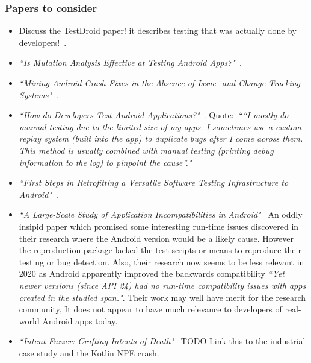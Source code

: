 \subsubsection{Papers to consider}
\begin{itemize}
    \item Discuss the TestDroid paper! it describes testing that was actually done by developers!~\cite{kaasila2012_testdroid_etc}.
    
    \item \emph{``Is Mutation Analysis Effective at Testing Android Apps?"}~\cite{deng2017_is_mutation_analysis_effective_at_testing_android_apps}.
    
    \item \emph{``Mining Android Crash Fixes in the Absence of Issue- and Change-Tracking Systems"}~\cite{kong2019_mining_android_crash_fixes}.
    
    \item \emph{``How do Developers Test Android Applications?"}~\cite{linares2017_how_do_developers_test_android_apps}. Quote:~\emph{``“I mostly do manual testing due to the limited size of my apps. I sometimes use a custom replay system (built into the app) to duplicate bugs after I come across them. This method is usually combined with manual testing (printing debug information to the log) to pinpoint the cause”."}
    
    \item \emph{``First Steps in Retrofitting a Versatile Software Testing Infrastructure to Android"}~\cite{oliver2018_first_steps_in_retrofitting_a_versatile_sw_testing_architecture}.
    
    \item \emph{``A Large-Scale Study of Application Incompatibilities in Android"}~\cite{cai2019_large_scale_study_of_android_incompatibilities} An oddly insipid paper which promised some interesting run-time issues discovered in their research where the Android version would be a likely cause. However the reproduction package lacked the test scripts or means to reproduce their testing or bug detection. Also, their research now seems to be less relevant in 2020 as Android apparently improved the backwards compatibility \emph{``Yet newer versions (since API 24) had no run-time compatibility issues with apps created in the studied span."}. Their work may well have merit for the research community, It does not appear to have much relevance to developers of real-world Android apps today.
    

    \item \emph{``Intent Fuzzer: Crafting Intents of Death"}~\cite{10.1145/2632168.2632169} TODO Link this to the industrial case study and the Kotlin NPE crash.
    

\end{itemize}
